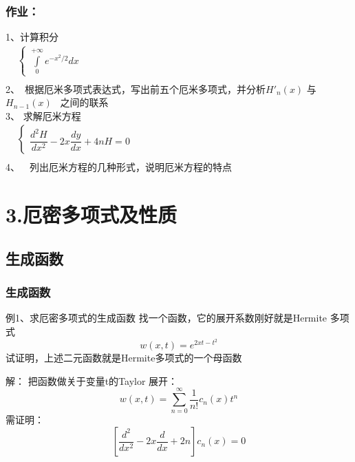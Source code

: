 \begin{frame}
	\frametitle{作业：}
	1、计算积分\\ 
	$\begin{array}{lllllllll}
		& \begin{cases}
			\int\limits_{0}^{+\infty} e^{-x^2 /2} dx
		\end{cases}\\	
	\end{array}$ \\ 
	2、 根据厄米多项式表达式，写出前五个厄米多项式，并分析$H'_n (x)$ 与$H_{n-1} (x)$  之间的联系\\
	3、 求解厄米方程\\ 
	$\begin{array}{lllllllll}
		& \begin{cases}
			\dfrac{d^2 H}{d x^2} -2x \dfrac{d y}{d x} +4n H =0 	
		\end{cases}\\	
	\end{array}$ \\ 
	4、  列出厄米方程的几种形式，说明厄米方程的特点
\end{frame}

\section{3.厄密多项式及性质}

\subsection{生成函数}

\begin{frame}
	\frametitle{ 生成函数 }
	\begin{exampleblock} { 例1、求厄密多项式的生成函数 }
		找一个函数，它的展开系数刚好就是Hermite 多项式
		 \begin{equation*}
			w(x,t)=e^{2xt-t^2}
		\end{equation*}
		试证明，上述二元函数就是Hermite多项式的一个母函数
	\end{exampleblock}
	\alert {解：}	把函数做关于变量t的Taylor 展开：
	\begin{equation*}
		w(x,t) =\sum_{n=0}^{\infty} \frac{1}{n!}  c_n(x) t^n
	\end{equation*}
	需证明：
	\begin{equation*}
		\left[  \frac{d^2}{dx^2} -2x\frac{d}{dx} +2n  \right] c_n(x)=0
	\end{equation*}
\end{frame}

